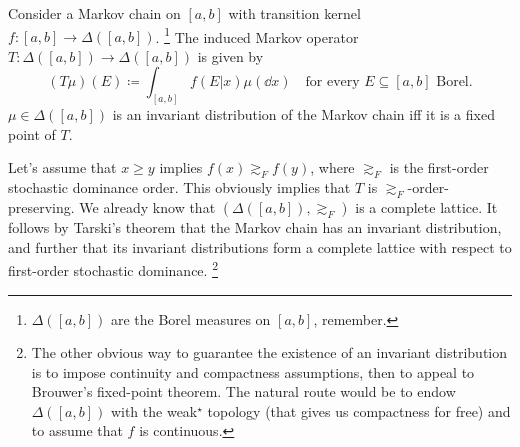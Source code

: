 \documentclass[11pt,letterpaper,reqno,oneside]{article}
\begin{document}
\begin{example}
	Consider a Markov chain on $[a,b]$ with transition kernel $f : [a,b] \to \Delta([a,b])$.%
		\footnote{$\Delta([a,b])$ are the Borel measures on $[a,b]$, remember.}
	The induced Markov operator $T : \Delta([a,b]) \to \Delta([a,b])$ is given by
	\begin{equation*}
		(T\mu)(E) \coloneqq \int_{[a,b]} f(E|x) \mu(\dd x)
		\quad\text{for every $E\subseteq [a,b]$ Borel} .
	\end{equation*}
	$\mu \in \Delta([a,b])$ is an invariant distribution of the Markov chain iff it is a fixed point of $T$.

	Let's assume that $x \geq y$ implies $f(x) \gtrsim_F f(y)$, where $\gtrsim_F$ is the first-order stochastic dominance order. This obviously implies that $T$ is $\gtrsim_F$-order-preserving. We already know that $( \Delta([a,b]), \gtrsim_F )$ is a complete lattice. It follows by Tarski's theorem that the Markov chain has an invariant distribution, and further that its invariant distributions form a complete lattice with respect to first-order stochastic dominance.%
		\footnote{The other obvious way to guarantee the existence of an invariant distribution is to impose continuity and compactness assumptions, then to appeal to Brouwer's fixed-point theorem. The natural route would be to endow $\Delta([a,b])$ with the weak$^\star$ topology (that gives us compactness for free) and to assume that $f$ is continuous.}
\end{example}
\end{document}
